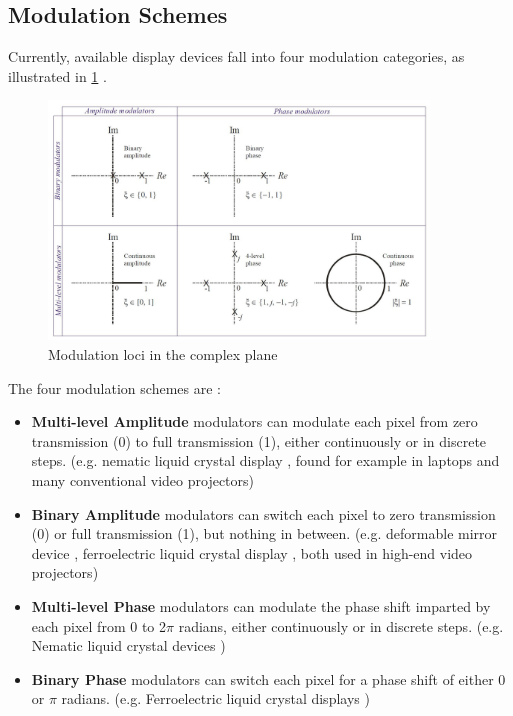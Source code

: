 \subsection{Modulation Schemes}
Currently, available display devices fall into four modulation categories, as illustrated in \cref{fig:modulation_loci} \cite{Cable2006}.
\begin{figure}[H]
  \centering
  \includegraphics[width=0.9\textwidth]{modulation_loci.jpg}
  \caption{Modulation loci in the complex plane \cite{Cable2006}} \label{fig:modulation_loci}
\end{figure}

The four modulation schemes are \cite{Cable2006}:
\begin{itemize}
  \item \textbf{Multi-level Amplitude} modulators can modulate each pixel from zero transmission (0) to full transmission (1), either continuously or in discrete steps. (e.g. nematic liquid crystal display \cite{Schadt1971}, found for example in laptops and many conventional video projectors)
  \item \textbf{Binary Amplitude} modulators can switch each pixel to zero transmission (0) or full transmission (1), but nothing in between. (e.g. deformable mirror device \cite{Pape1983}, ferroelectric liquid crystal display \cite{Johnson1993}, both used in high-end video projectors)
  \item \textbf{Multi-level Phase} modulators can modulate the phase shift imparted by each pixel from 0 to 2$\pi$ radians, either continuously or in discrete steps. (e.g. Nematic liquid crystal devices \cite{Lee2004})
  \item \textbf{Binary Phase} modulators can switch each pixel for a phase shift of either 0 or $\pi$ radians. (e.g. Ferroelectric liquid crystal displays \cite{Broomfield1992})
\end{itemize}


